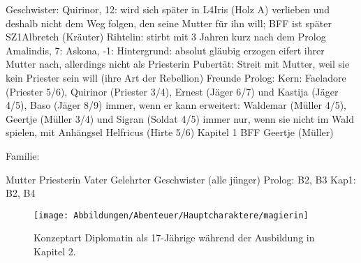 \begin{outline}
		\2 Geschwister:
			\3 Quirinor, 12: wird sich später in L4Iris (Holz A) verlieben und deshalb nicht dem Weg folgen, den seine Mutter für ihn will; BFF ist später SZ1Albretch (Kräuter) 
			\3 Rihtelin: stirbt mit 3 Jahren kurz nach dem Prolog
			\3 Amalindis, 7: 
			\3 Askona, -1: 
	\1 Hintergrund:
		\2 absolut gläubig erzogen
		\2 eifert ihrer Mutter nach, allerdings nicht als Priesterin
		\2 Pubertät: Streit mit Mutter, weil sie kein Priester sein will (ihre Art der Rebellion)
	\1 Freunde
		\2 Prolog:
			\3 Kern: Faeladore (Priester 5/6), Quirinor (Priester 3/4), Ernest (Jäger 6/7) und Kastija (Jäger 4/5), Baso (Jäger 8/9) immer, wenn er kann
			\3 erweitert: Waldemar (Müller 4/5), Geertje (Müller 3/4) und Sigran (Soldat 4/5) immer nur, wenn sie nicht im Wald spielen, mit Anhängsel Helfricus (Hirte 5/6)
		\2 Kapitel 1
			\3 BFF Geertje (Müller)
\end{outline}

Familie:
\begin{outline}
	\1 Mutter Priesterin
	\1 Vater Gelehrter
		 Geschwister (alle jünger)
		\2 Prolog: B2, B3
		\2 Kap1: B2, B4
\end{outline}

\begin{figure}[tbh]
	\centering
	\texttt{[image: Abbildungen/Abenteuer/Hauptcharaktere/magierin]}
	\caption[Konzeptart Diplomatin]{Konzeptart Diplomatin als 17-Jährige während der Ausbildung in Kapitel 2.}
	\label{fig:mc-diplomatin}
\end{figure}





